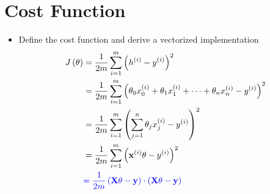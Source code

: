 \section{Cost Function}
\begin{itemize}
    \item Define the cost function and derive a vectorized implementation
    \begin{equation}
        \begin{split}
            J\left(\theta\right)& = \frac{1}{2m}\sum_{i=1}^{m}\left( h^{(i)} - y^{(i)} \right)^2\\
            & = \frac{1}{2m}\sum_{i=1}^{m}\left( \theta_0x_0^{(i)} + \theta_1x_1^{(i)} + \dots + \theta_nx_n^{(i)} - y^{(i)} \right)^2\\
            & = \frac{1}{2m}\sum_{i=1}^{m}\left( \sum_{j=1}^{n}{\theta_j x_j^{(i)}} - y^{(i)} \right)^2\\
            & = \frac{1}{2m}\sum_{i=1}^{m}\left( \mathbf{x}^{(i)}\theta - y^{(i)} \right)^2\\
            & \textcolor{blue}{= \frac{1}{2m}\left( \mathbf{X}\theta - \mathbf{y} \right)\cdot\left( \mathbf{X}\theta - \mathbf{y} \right)}
        \end{split}
    \end{equation}
\end{itemize}
    

